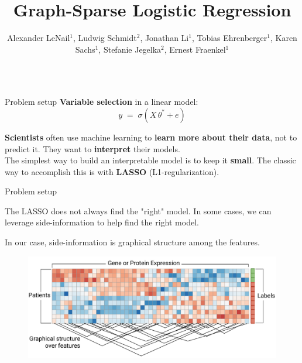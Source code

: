 \documentclass[svgnames,final]{beamer}
\title{Graph-Sparse Logistic Regression}
\author{Alexander LeNail$^1$, Ludwig Schmidt$^2$, Jonathan Li$^1$, Tobias Ehrenberger$^1$, Karen Sachs$^1$, Stefanie Jegelka$^2$, Ernest Fraenkel$^1$}
\institute{$^1$MIT BE, $^2$MIT CSAIL}
\newcommand{\thetastar}{\ensuremath{\theta^*}}
\begin{document}
\begin{frame}
\vspace{-.5cm}
\begin{columns}[T]

\begin{column}{.3\linewidth}

	\begin{block}{Problem setup}
    \textbf{Variable selection} in a linear model:
    {\Large
    \[
      y \; = \; \sigma(X \,  \thetastar + e)
    \]
    }

		\textbf{Scientists} often use machine learning to \textbf{learn more about their data},
		not to predict it. They want to \textbf{interpret} their models. \\

		The simplest way to build an interpretable model is to keep it \textbf{small}.
		The classic way to accomplish this is with \textbf{LASSO} (L1-regularization).

	\end{block}

	\vspace{2cm}

	\begin{block}{Problem setup}

		The LASSO does not always find the "right" model. In some cases,
		we can leverage side-information to help find the right model.

		\vspace{.5cm}

		In our case, side-information is graphical structure among the features.

		\begin{figure}[h]
		\centering
		\includegraphics[width=\linewidth]{images/matrix.pdf}
		\end{figure}


\end{block}
\end{column}
\end{columns}
\end{frame}
\end{document}
